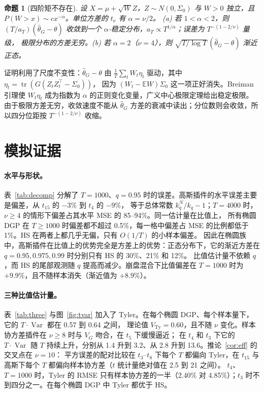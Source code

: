 \documentclass[11pt,UTF8]{ctexart}
\newcommand{\E}{\mathbb{E}}
\newcommand{\Var}{\operatorname{Var}}
\newcommand{\tr}{\operatorname{tr}}
\newtheorem{proposition}{命题}
\begin{document}
\begin{proposition}[四阶矩不存在]\label{prop:stable}
设 $X=\mu+\sqrt W Z$，$Z\sim N(0,\Sigma_0)$ 与 $W>0$ 独立，且 $P(W>x)\sim cx^{-\alpha}$。单位方差的 $t_\nu$ 有 $\alpha=\nu/2$。
(a) 若 $1<\alpha<2$，则 $(T/a_T)(\hat\theta_G-\theta)$ 收敛到一个 $\alpha$-稳定分布，$a_T\propto T^{1/\alpha}$；误差为 $T^{-(1-2/\nu)}$ 量级，
极限分布的方差无穷。(b) 若 $\alpha=2$（$\nu=4$），则 $\sqrt{T/\log T}\,(\hat\theta_G-\theta)$ 渐近正态。
\end{proposition}

证明利用了尺度不变性：$\hat\theta_G-\theta$ 由 $\frac1T\sum_tW_t\eta_t$ 驱动，其中 $\eta_t=\tr(G(Z_tZ_t^\top-\Sigma_0))$，
因为 $(W_t-\E W)\Sigma_0$ 这一项正好消失。Breiman 引理使 $W_t\eta_t$ 成为指数为 $\alpha$ 的正则变化变量，广义中心极限定理给出稳定极限。
由于极限方差无穷，收敛速度不能从 $\hat\theta_G$ 方差的衰减中读出；分位数则会收敛，所以四分位距按 $T^{-(1-2/\nu)}$ 收缩。

\section{模拟证据}\label{sec:sim}

\paragraph{水平与形状。}
表~\ref{tab:decomp} 分解了 $T=1000$、$q=0.95$ 时的误差。高斯插件的水平误差主要是偏差，从 $t_{15}$ 的 $-3\%$ 到 $t_4$ 的 $-9\%$，
等于总体常数 $k^N_q/k_q-1$；$T=4000$ 时，$\nu\ge4$ 的情形下偏差占其水平 MSE 的 85--94\%。同一估计量在比值上，
所有椭圆 DGP 在 $T\ge1000$ 时偏差都不超过 0.5\%，每一格中偏差占 MSE 的比例都低于 1\%。HS 在两者上都几乎无偏，只有 $O(1/T)$ 的小样本偏差。
因此在椭圆族中，高斯插件在比值上的优势完全是方差上的优势：正态分布下，它的渐近方差在 $q=0.95,0.975,0.99$ 时分别只有 HS 的 30\%、21\% 和 12\%。
比值估计量不依赖 $q$，而 HS 的尾部观测随 $q$ 提高而减少。崩盘混合下比值偏差在 $T=1000$ 时为 $+9.9\%$，且不随样本消失（渐近值为 $+8.9\%$）。

\begin{table}[H]
\centering\small
\caption{相对误差的偏差与标准差（\%），$T=1000$，$q=0.95$，5{,}000 次重复。}
\label{tab:decomp}

\end{table}

\paragraph{三种比值估计量。}
表~\ref{tab:three} 与图~\ref{fig:tvar} 加入了 Tyler。在每个椭圆 DGP、每个样本量下，它的 $T\cdot\Var$ 都在 0.57 到 0.64 之间，
理论值 $V_{\mathrm{Ty}}=0.60$，且不随 $\nu$ 变化。样本协方差插件在 $\nu\ge8$ 时与 $V_G$ 吻合，在 $t_5$ 下缓慢逼近；
在 $t_4$ 和 $t_3$ 下它的 $T\cdot\Var$ 随 $T$ 持续上升，分别从 1.4 升到 3.2、从 2.8 升到 13.6。推论~\ref{cor:eff} 的交叉点在 $\nu=10$：
平方误差的配对比较在 $t_3$--$t_8$ 下每个 $T$ 都偏向 Tyler，在 $t_{15}$ 与高斯下每个 $T$ 都偏向样本协方差（$t$ 统计量绝对值在 2.5 到 21 之间）。
$t_4$、$T=1000$ 时，Tyler 的 RMSE 只有样本协方差的一半（2.40\% 对 4.85\%）；$t_3$ 时不到四分之一。在每个椭圆 DGP 中 Tyler 都优于 HS。
\end{document}
